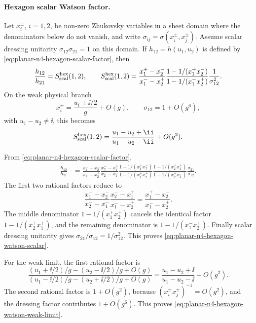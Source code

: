 \paragraph{Hexagon scalar Watson factor.}
Let \(x_i^\pm\), \(i=1,2\), be non-zero Zhukovsky variables in a sheet domain
where the denominators below do not vanish, and write
\(\sigma_{ij}=\sigma(x_i^\pm,x_j^\pm)\).  Assume scalar dressing unitarity
\(\sigma_{12}\sigma_{21}=1\) on this domain.  If \(h_{12}=h(u_1,u_2)\) is
defined by \eqref{eq:planar-n4-hexagon-scalar-factor}, then
\begin{equation}
  \frac{h_{12}}{h_{21}}
  =
  S^{\rm hex}_{\rm scal}(1,2),
  \qquad
  S^{\rm hex}_{\rm scal}(1,2)
  =
  \frac{x_1^+ -x_2^-}{x_1^- -x_2^+}
  \frac{1-1/(x_1^+x_2^-)}{1-1/(x_1^-x_2^+)}
  \frac{1}{\sigma_{12}^2}.
  \label{eq:planar-n4-hexagon-watson-scalar}
\end{equation}
On the weak physical branch
\[
  x_i^\pm=\frac{u_i\pm\ii/2}{g}+O(g),
  \qquad
  \sigma_{12}=1+O(g^6),
\]
with \(u_1-u_2\neq\ii\), this becomes
\begin{equation}
  S^{\rm hex}_{\rm scal}(1,2)
  =
  \frac{u_1-u_2+\ii}{u_1-u_2-\ii}
  +O(g^2).
  \label{eq:planar-n4-hexagon-watson-weak-limit}
\end{equation}

From \eqref{eq:planar-n4-hexagon-scalar-factor},
\[
\begin{aligned}
  \frac{h_{12}}{h_{21}}
  &=
  \frac{x_1^- -x_2^-}{x_1^- -x_2^+}
  \frac{x_2^- -x_1^+}{x_2^- -x_1^-}
  \frac{1-1/(x_1^+x_2^-)}{1-1/(x_1^+x_2^+)}
  \frac{1-1/(x_2^+x_1^+)}{1-1/(x_2^+x_1^-)}
  \frac{\sigma_{21}}{\sigma_{12}} .
\end{aligned}
\]
The first two rational factors reduce to
\[
  \frac{x_1^- -x_2^-}{x_2^- -x_1^-}
  \frac{x_2^- -x_1^+}{x_1^- -x_2^+}
  =
  \frac{x_1^+ -x_2^-}{x_1^- -x_2^+}.
\]
The middle denominator \(1-1/(x_1^+x_2^+)\) cancels the identical factor
\(1-1/(x_2^+x_1^+)\), and the remaining denominator is
\(1-1/(x_1^-x_2^+)\).  Finally scalar dressing unitarity gives
\(\sigma_{21}/\sigma_{12}=1/\sigma_{12}^2\).  This proves
\eqref{eq:planar-n4-hexagon-watson-scalar}.

For the weak limit, the first rational factor is
\[
  \frac{(u_1+\ii/2)/g-(u_2-\ii/2)/g+O(g)}
       {(u_1-\ii/2)/g-(u_2+\ii/2)/g+O(g)}
  =
  \frac{u_1-u_2+\ii}{u_1-u_2-\ii}+O(g^2).
\]
The second rational factor is \(1+O(g^2)\), because
\((x_i^\pm x_j^\pm)^{-1}=O(g^2)\), and the dressing factor contributes
\(1+O(g^6)\).  This proves
\eqref{eq:planar-n4-hexagon-watson-weak-limit}.

